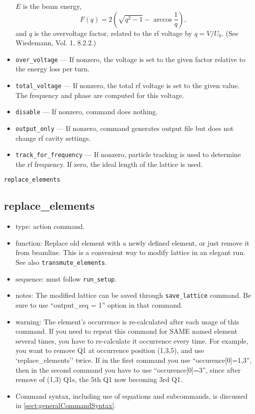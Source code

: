 \documentclass[11pt]{article}
\begin{document}
\begin{itemize}
$E$ is the beam energy, 
\begin{equation}
F(q) = 2 \left(\sqrt{q^2-1} - \arccos \frac{1}{q}\right),
\end{equation}
and $q$ is the overvoltage factor, related to the rf voltage by $q = V/U_0$. (See Wiedemann, Vol. 1, 8.2.2.)
\item \verb|over_voltage| --- If nonzero, the voltage is set to the given factor relative to the 
energy loss per turn.
\item \verb|total_voltage| --- If nonzero, the total rf voltage is set to the given value. The frequency and
  phase are computed for this voltage.
\item \verb|disable| --- If nonzero, command does nothing.
\item \verb|output_only| --- If nonzero, command generates output file but does not change rf cavity settings.
\item \verb|track_for_frequency| --- If nonzero, particle tracking is used to determine the rf frequency. If zero,
  the ideal length of the lattice is used.
\end{itemize}

\newpage
\begin{center}{\Large\verb|replace_elements|}\end{center}
\subsection{replace\_elements \label{subsec:replaceelements}}

\begin{itemize}
\item type: action command.
\item function: Replace old element with a newly defined element, or just 
   remove it from beamline. This is a convenient way to modify lattice in an elegant run.
   See also \verb|transmute_elements|.
\item sequence: must follow \verb|run_setup|.
\item notes: 
	The modified lattice can be saved through \verb|save_lattice|
   command. Be sure to use ``output\_seq = 1'' option in that command.  
\item warning:
   The element's occurrence is re-calculated after each usage of this command. If 
   you need to repeat this command for SAME named element several times, you have to re-calculate 
   it occurrence every time. For example, you want to remove Q1 at occurrence position 
   (1,3,5), and use 
   `replace\_elements'' twice. If in the first command you use ``occurence[0]=1,3'',
   then in the second command you have to use ``occurence[0]=3'', since after remove of
   (1,3) Q1s, the 5th Q1 now becoming 3rd Q1.
\item Command syntax, including use of equations and subcommands, is discussed in \ref{sect:generalCommandSyntax}.
\end{itemize}
\end{document}
